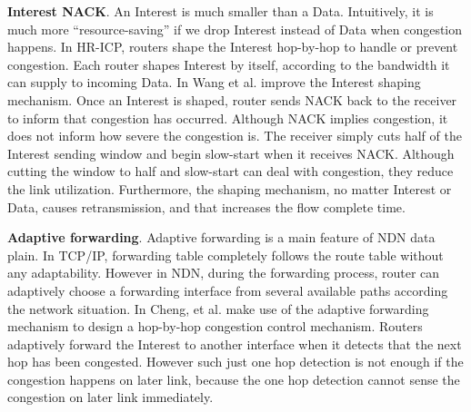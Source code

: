\textbf{Interest NACK}. An Interest is much smaller than a Data. Intuitively, it is much more ``resource-saving'' if we drop Interest instead of Data when congestion happens. In HR-ICP\cite{shape}, routers shape the Interest hop-by-hop to handle or prevent congestion. Each router shapes Interest by itself, according to the bandwidth it can supply to incoming Data. In \cite{improveshape} Wang et al. improve the Interest shaping mechanism. Once an Interest is shaped, router sends NACK back to the receiver to inform that congestion has occurred. Although NACK implies congestion, it does not inform how severe the congestion is. The receiver simply cuts half of the Interest sending window and begin slow-start when it receives NACK. Although cutting the window to half and slow-start can deal with congestion, they reduce the link utilization. Furthermore, the shaping mechanism, no matter Interest or Data, causes retransmission, and that increases the flow complete time. 

\textbf{Adaptive forwarding}. Adaptive forwarding is a main feature of NDN data plain. In TCP/IP, forwarding table completely follows the route table without any adaptability. However in NDN, during the forwarding process, router can adaptively choose a forwarding interface from several available paths according the network situation. In \cite{Adaptive} Cheng, et al. make use of the adaptive forwarding mechanism to design a hop-by-hop congestion control mechanism. Routers adaptively forward the Interest to another interface when it detects that the next hop has been congested. However such just one hop detection is not enough if the congestion happens on later link, because the one hop detection cannot sense the congestion on later link immediately. 